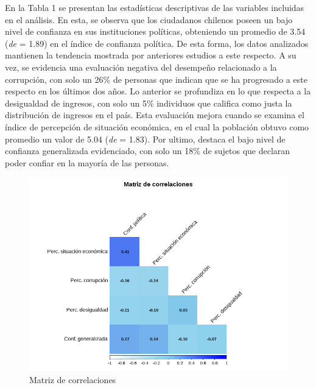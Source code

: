 \documentclass[12pt,twoside]{templates/facsothesis}
\begin{document}
En la Tabla 1 se presentan las estadísticas descriptivas de las variables incluidas en el análisis. En esta, se observa que los ciudadanos chilenos poseen un bajo nivel de confianza en sus instituciones políticas, obteniendo un promedio de 3.54 (\emph{de} = 1.89) en el índice de confianza política. De esta forma, los datos analizados mantienen la tendencia mostrada por anteriores estudios a este respecto. A su vez, se evidencia una evaluación negativa del desempeño relacionado a la corrupción, con solo un 26\% de personas que indican que se ha progresado a este respecto en los últimos dos años. Lo anterior se profundiza en lo que respecta a la desigualdad de ingresos, con solo un 5\% individuos que califica como justa la distribución de ingresos en el país. Esta evaluación mejora cuando se examina el índice de percepción de situación económica, en el cual la población obtuvo como promedio un valor de 5.04 (\emph{de} = 1.83). Por ultimo, destaca el bajo nivel de confianza generalizada evidenciado, con solo un 18\% de sujetos que declaran poder confiar en la mayoría de las personas.

\begin{figure}[!ht]

{\centering \includegraphics[width=1\linewidth,]{IPO/output/graphs/corrplot} 

}

\caption{Matriz de correlaciones}\label{fig:grafico-1}
\end{figure}
\end{document}
